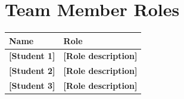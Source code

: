 \documentclass[11pt,a4paper]{article}
\newcommand{\placeholder}[1]{\textbf{[#1]}}
\begin{document}
\newpage
\section*{Team Member Roles}

\begin{table}[H]
  \centering
  \begin{tabular}{ll}
    \toprule
    {Name} & {Role} \\
    \midrule
    \placeholder{Student 1} & \placeholder{Role description} \\
    \placeholder{Student 2} & \placeholder{Role description} \\
    \placeholder{Student 3} & \placeholder{Role description} \\
    \bottomrule
  \end{tabular}
\end{table}
\end{document}
